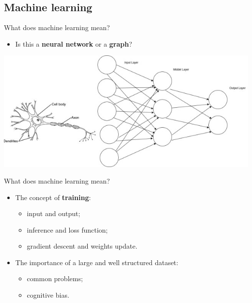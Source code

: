 \documentclass{beamer}
\begin{document}
\subsection{Machine learning}

\begin{frame}{What does machine learning mean?}
	\begin{itemize}
		[triangle]
  		\item
    			Is this a \textbf{neural network} or a \textbf{graph}?
	\end{itemize}
	\begin{center}
		\includegraphics[scale=0.5]{neuralNet}
	\end{center}
\end{frame}

\begin{frame}{What does machine learning mean?}
	\begin{itemize}
		\setlength\itemsep{1em}
		[triangle]
  		\item 
			The concept of \textbf{training}:
    			\begin{itemize}
				[circle]
    				\item
      					input and output;
    				\item    
      					inference and loss function;
   				\item
					gradient descent and weights update.
			\end{itemize}
		\item
    			The importance of a large and well structured dataset:
    			\begin{itemize}
				[circle]
   				\item 
					common problems;
    				\item 
					cognitive bias.
    			\end{itemize}
 	 \end{itemize}
\end{frame}
\end{document}
